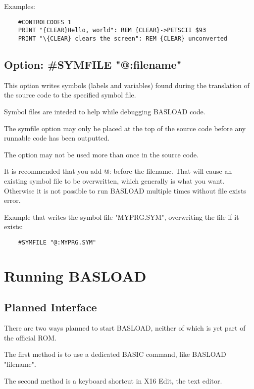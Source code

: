 \documentclass{article}
\begin{document}
        Examples:

    \begin{verbatim}
    #CONTROLCODES 1
    PRINT "{CLEAR}Hello, world": REM {CLEAR}->PETSCII $93
    PRINT "\{CLEAR} clears the screen": REM {CLEAR} unconverted
    \end{verbatim}

    \subsection{Option: \#SYMFILE "@:filename"}

        This option writes symbols (labels and variables) found during the
        translation of the source code to the specified
        symbol file.

        Symbol files are inteded to help while debugging BASLOAD code.
    
        The symfile option may only be placed at the top of
        the source code before any runnable code has
        been outputted.

        The option may not be used more than once in the source code.

        It is recommended that you add @: before the filename. That will cause
        an existing symbol file to be overwritten, which generally is what you
        want. Otherwise it is not possible to run BASLOAD multiple times
        without file exists error.

        Example that writes the symbol file "MYPRG.SYM", overwriting the
        file if it exists:
        \begin{verbatim}
    #SYMFILE "@:MYPRG.SYM"
        \end{verbatim}

\section{Running BASLOAD}

    \subsection{Planned Interface}

        There are two ways planned to start BASLOAD, neither of which is yet
        part of the official ROM.

        The first method is to use a dedicated BASIC command, like BASLOAD "filename".

        The second method is a keyboard shortcut in X16 Edit, the text editor.
\end{document}
